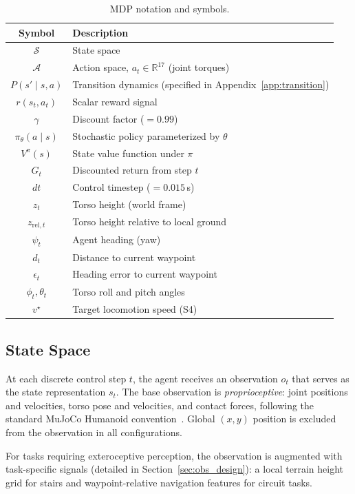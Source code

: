 \documentclass[conference]{IEEEtran}
\begin{document}
\begin{table}[h!]
\caption{MDP notation and symbols.}
\label{tab:notation}
\centering
\small
\begin{tabular}{@{}cl@{}}
\toprule
\textbf{Symbol} & \textbf{Description} \\
\midrule
$\mathcal{S}$ & State space \\
$\mathcal{A}$ & Action space, $a_t \in \mathbb{R}^{17}$ (joint torques) \\
$P(s' \mid s, a)$ & Transition dynamics (specified in Appendix~\ref{app:transition}) \\
$r(s_t, a_t)$ & Scalar reward signal \\
$\gamma$ & Discount factor ($= 0.99$) \\
$\pi_\theta(a \mid s)$ & Stochastic policy parameterized by $\theta$ \\
$V^{\pi}(s)$ & State value function under $\pi$ \\
$G_t$ & Discounted return from step $t$ \\
$dt$ & Control timestep ($= 0.015\,$s) \\
$z_t$ & Torso height (world frame) \\
$z_{\mathrm{rel},t}$ & Torso height relative to local ground \\
$\psi_t$ & Agent heading (yaw) \\
$d_t$ & Distance to current waypoint \\
$\epsilon_t$ & Heading error to current waypoint \\
$\phi_t, \theta_t$ & Torso roll and pitch angles \\
$v^\star$ & Target locomotion speed (S4) \\
\bottomrule
\end{tabular}
\end{table}


\subsection{State Space}

At each discrete control step $t$, the agent receives an observation $o_t$ that serves as the state representation $s_t$. The base observation is \emph{proprioceptive}: joint positions and velocities, torso pose and velocities, and contact forces, following the standard MuJoCo Humanoid convention~\cite{todorov2012mujoco}. Global $(x,y)$ position is excluded from the observation in all configurations.

For tasks requiring exteroceptive perception, the observation is augmented with task-specific signals (detailed in Section~\ref{sec:obs_design}):
a local terrain height grid for stairs and waypoint-relative navigation features for circuit tasks.
\end{document}

